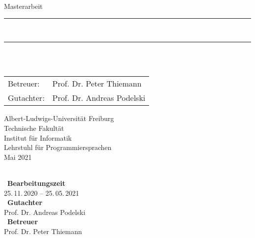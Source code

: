 \begin{titlepage}
\begin{center}

\newcommand{\HorizontalLine}{\rule{\linewidth}{0.3mm}}

{\Large Masterarbeit}\\[1.3cm]


\HorizontalLine \\[0.4cm]
{ \huge \bfseries \thetitle }
\HorizontalLine \\[1.5cm]


{\Huge \theauthor} \\[2cm]


\begin{tabular}[hc]{>{\huge}l >{\huge}l}
  Betreuer: & Prof. Dr. Peter Thiemann \\[0.3cm]
  Gutachter: & Prof. Dr. Andreas Podelski \\[1.2cm]
\end{tabular}
\vfill  %

\Large {
    Albert-Ludwigs-Universität Freiburg\\
    Technische Fakultät\\
    Institut für Informatik\\
    Lehrstuhl für Programmiersprachen\\[1cm]

    Mai 2021
    \\
}
\end{center}
\end{titlepage}

\thispagestyle{empty}
\ \vfill \ \\  %
\
\textbf{Bearbeitungszeit}            \smallskip{} \\
25.\,11.\,2020 -- 25.\,05.\,2021   \bigskip{} \\
\
\textbf{Gutachter}                  \smallskip{} \\
Prof. Dr. Andreas Podelski               \bigskip{} \\
\
\textbf{Betreuer}                  \smallskip{} \\
Prof. Dr. Peter Thiemann
